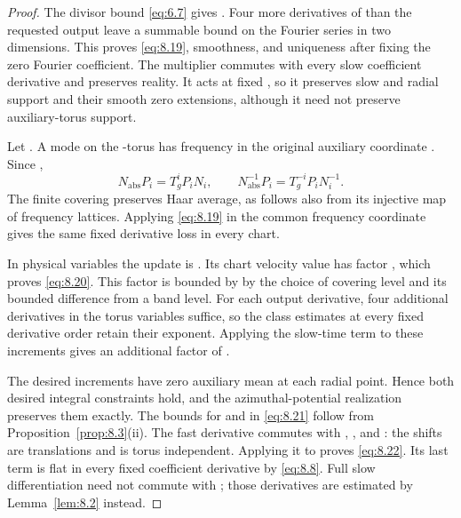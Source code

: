 \begin{proof}
The divisor bound \eqref{eq:6.7} gives
. Four more derivatives of
 than the requested output leave a summable
 bound on the Fourier series in two dimensions. This proves
\eqref{eq:8.19}, smoothness, and uniqueness after fixing the zero Fourier coefficient. The multiplier
commutes with every slow coefficient derivative and preserves reality. It acts at fixed
, so it preserves slow and radial support and their smooth zero
extensions, although it need not preserve auxiliary-torus support.

Let . A mode  on the
-torus has frequency  in the original
auxiliary coordinate . Since
,
\begin{equation}
N_{\mathrm{abs}}P_i=T_g^iP_iN_i,
\qquad
N_{\mathrm{abs}}^{-1}P_i=T_g^{-i}P_iN_i^{-1}.
\tag{8.23}\label{eq:8.23}
\end{equation}
The finite covering preserves Haar average, as follows also from its injective map of frequency
lattices. Applying \eqref{eq:8.19} in the common frequency coordinate
 gives the same fixed derivative loss in every chart.

In physical variables the update is
. Its chart velocity value has
factor
, which proves
\eqref{eq:8.20}. This factor is bounded by  by the choice of covering
level and its bounded difference from a band level. For each output derivative, four additional
derivatives in the torus variables suffice, so the class estimates at every fixed derivative order
retain their  exponent. Applying the slow-time term
 to these increments gives an additional factor of
.

The desired increments have zero auxiliary mean at each radial point. Hence both desired integral
constraints hold, and the azimuthal-potential realization preserves them exactly. The bounds for
 and  in \eqref{eq:8.21}
follow from Proposition~\ref{prop:8.3}(ii). The fast derivative commutes with
, , and
: the shifts are translations and
 is torus independent. Applying it to
 proves \eqref{eq:8.22}. Its last term is flat in every
fixed coefficient derivative by \eqref{eq:8.8}. Full slow differentiation need not commute with
; those derivatives are estimated by Lemma~\ref{lem:8.2} instead.
\end{proof}

